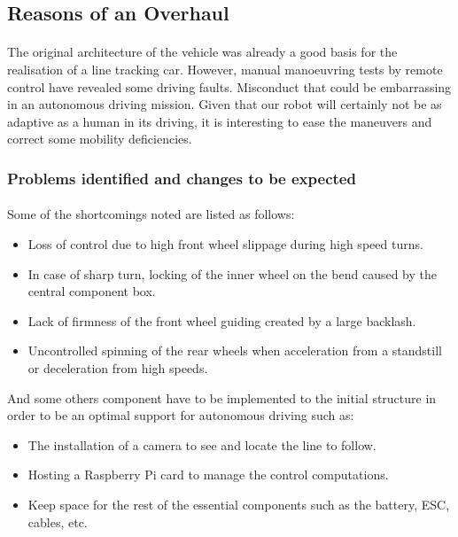 \subsection{Reasons of an Overhaul}
\paragraph{}
The original architecture of the vehicle was already a good basis for the
realisation of a line tracking car. However, manual manoeuvring tests by
remote control have revealed some driving faults. Misconduct that could
be embarrassing in an autonomous driving mission. Given that our robot
will certainly not be as adaptive as a human in its driving, it is
interesting to ease the maneuvers and correct some mobility deficiencies.

\subsubsection{Problems identified and changes to be expected}
\paragraph{}
Some of the shortcomings noted are listed as follows:
\begin{itemize}
    \item Loss of control due to high front wheel slippage during high speed turns.
    \item In case of sharp turn, locking of the inner wheel on the bend caused by
    the central component box.
    \item Lack of firmness of the front wheel guiding created by a large backlash.
    \item Uncontrolled spinning of the rear wheels when acceleration from a
    standstill or deceleration from high speeds.
\end{itemize}
And some others component have to be implemented to the initial structure in order
to be an optimal support for autonomous driving such as:
\begin{itemize}
    \item The installation of a camera to see and locate the line to follow.
    \item Hosting a Raspberry Pi card to manage the control computations.
    \item Keep space for the rest of the essential components such as the battery,
    ESC, cables, etc.
\end{itemize}


